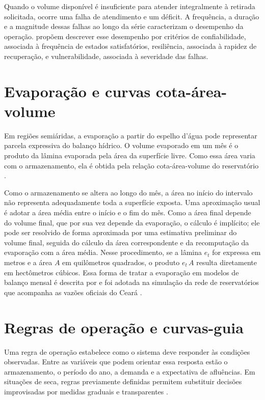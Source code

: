 Quando o volume disponível é insuficiente para atender integralmente à retirada solicitada, ocorre uma falha de atendimento e um déficit. A frequência, a duração e a magnitude dessas falhas ao longo da série caracterizam o desempenho da operação.  propõem descrever esse desempenho por critérios de confiabilidade, associada à frequência de estados satisfatórios, resiliência, associada à rapidez de recuperação, e vulnerabilidade, associada à severidade das falhas.

\section{Evaporação e curvas cota-área-volume}
\label{sec:evaporacao-cav}

Em regiões semiáridas, a evaporação a partir do espelho d'água pode representar parcela expressiva do balanço hídrico. O volume evaporado em um mês é o produto da lâmina evaporada pela área da superfície livre. Como essa área varia com o armazenamento, ela é obtida pela relação cota-área-volume do reservatório \cite{loucksVanBeek2017}.

Como o armazenamento se altera ao longo do mês, a área no início do intervalo não representa adequadamente toda a superfície exposta. Uma aproximação usual é adotar a área média entre o início e o fim do mês. Como a área final depende do volume final, que por sua vez depende da evaporação, o cálculo é implícito; ele pode ser resolvido de forma aproximada por uma estimativa preliminar do volume final, seguida do cálculo da área correspondente e da recomputação da evaporação com a área média. Nesse procedimento, se a lâmina $e_t$ for expressa em metros e a área $A$ em quilômetros quadrados, o produto $e_t\,A$ resulta diretamente em hectômetros cúbicos. Essa forma de tratar a evaporação em modelos de balanço mensal é descrita por  e foi adotada na simulação da rede de reservatórios que acompanha as vazões oficiais do Ceará \cite{ceara2021aloca}.

\section{Regras de operação e curvas-guia}
\label{sec:regras-operacao}

Uma regra de operação estabelece como o sistema deve responder às condições observadas. Entre as variáveis que podem orientar essa resposta estão o armazenamento, o período do ano, a demanda e a expectativa de afluências. Em situações de seca, regras previamente definidas permitem substituir decisões improvisadas por medidas graduais e transparentes \cite{deNys2016}.

